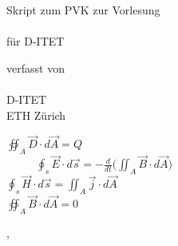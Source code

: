

\thispagestyle{empty}  %
\large  %

\begin{center}

\vfill


Skript zum PVK zur Vorlesung\\[10mm]

{\LARGE\bfseries\mytitle} \\
\vspace{1cm}
für D-ITET
\vfill


verfasst von \\[5mm]
{\large\bfseries\myauthor}\\[5mm]
D-ITET\\
ETH Zürich \\
\vspace{4cm}

$ \displaystyle \oiint_A \vec{D} \cdot d \vec{A} = Q \  \ \ \ \  \ \ \ \ \ \ \ \ $ \\

$ \displaystyle  \ \ \ \  \ \ \ \   \ \ \ \ \oint_s \vec{E} \cdot d \vec{s} = - \frac{d}{dt} \bigg( \iint_A \vec{B} \cdot d \vec{A}  \bigg)$\\


$ \displaystyle \oint_s \vec{H} \cdot d \vec{s} = \iint_A \vec{j} \cdot d\vec{A}   \ \ \ \  $\\
$ \displaystyle \oiint_A \vec{B} \cdot d \vec{A} = 0 \     \   \ \ \ \  \ \ \ \   \ \ \ \  $\\


\vfill

\mysubmissiontown, \mysubmissionmonth~\mysubmissionyear

\end{center}
\normalsize %

\newpage


